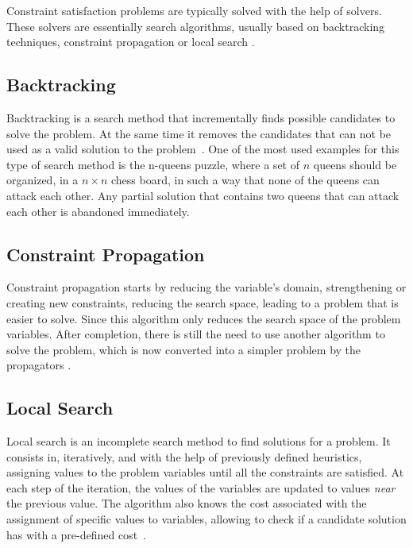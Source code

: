 Constraint satisfaction problems are typically solved with the help of solvers. These solvers are essentially search algorithms, usually based on backtracking techniques\cite{Knuth1997}, constraint propagation \cite{Lecoutre2010} or local search \cite{Dechter2003}. 

\subsection{Backtracking}

Backtracking is a search method that incrementally finds possible candidates to solve the problem. At the same time it removes the candidates that can not be used as a valid solution to the problem~\cite{Knuth1997}. One of the most used examples for this type of search method is the n-queens puzzle, where a set of $n$ queens should be organized, in a $n \times n$ chess board, in such a way that none of the queens can attack each other. Any partial solution that contains two queens that can attack each other is abandoned immediately.

\subsection{Constraint Propagation}

Constraint propagation starts by reducing the variable's domain, strengthening or creating new constraints, reducing the search space, leading to a problem that is easier to solve. Since this algorithm only reduces the search space of the problem variables. After completion, there is still the need to use another algorithm to solve the problem, which is now converted into a simpler problem by the propagators \cite{Lecoutre2010}. 

\subsection{Local Search}

Local search is an incomplete search method to find solutions for a problem. It consists in, iteratively, and with the help of previously defined heuristics, assigning values to the problem variables until all the constraints are satisfied. At each step of the iteration, the values of the variables are updated to values \emph{near} the previous value. The algorithm also knows the cost associated with the assignment of specific values to variables, allowing to check if a candidate solution has with a pre-defined cost~\cite{Dechter2003}.